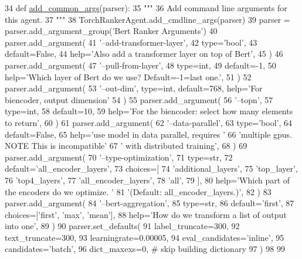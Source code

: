 \begin{DoxyCode}
34 \textcolor{keyword}{def }\hyperlink{namespaceparlai_1_1agents_1_1bert__ranker_1_1helpers_ac2e926c3aba3a62be09e2c37dffcaee2}{add\_common\_args}(parser):
35     \textcolor{stringliteral}{"""}
36 \textcolor{stringliteral}{    Add command line arguments for this agent.}
37 \textcolor{stringliteral}{    """}
38     TorchRankerAgent.add\_cmdline\_args(parser)
39     parser = parser.add\_argument\_group(\textcolor{stringliteral}{'Bert Ranker Arguments'})
40     parser.add\_argument(
41         \textcolor{stringliteral}{'--add-transformer-layer'},
42         type=\textcolor{stringliteral}{'bool'},
43         default=\textcolor{keyword}{False},
44         help=\textcolor{stringliteral}{'Also add a transformer layer on top of Bert'},
45     )
46     parser.add\_argument(
47         \textcolor{stringliteral}{'--pull-from-layer'},
48         type=int,
49         default=-1,
50         help=\textcolor{stringliteral}{'Which layer of Bert do we use? Default=-1=last one.'},
51     )
52     parser.add\_argument(
53         \textcolor{stringliteral}{'--out-dim'}, type=int, default=768, help=\textcolor{stringliteral}{'For biencoder, output dimension'}
54     )
55     parser.add\_argument(
56         \textcolor{stringliteral}{'--topn'},
57         type=int,
58         default=10,
59         help=\textcolor{stringliteral}{'For the biencoder: select how many elements to return'},
60     )
61     parser.add\_argument(
62         \textcolor{stringliteral}{'--data-parallel'},
63         type=\textcolor{stringliteral}{'bool'},
64         default=\textcolor{keyword}{False},
65         help=\textcolor{stringliteral}{'use model in data parallel, requires '}
66         \textcolor{stringliteral}{'multiple gpus. NOTE This is incompatible'}
67         \textcolor{stringliteral}{' with distributed training'},
68     )
69     parser.add\_argument(
70         \textcolor{stringliteral}{'--type-optimization'},
71         type=str,
72         default=\textcolor{stringliteral}{'all\_encoder\_layers'},
73         choices=[
74             \textcolor{stringliteral}{'additional\_layers'},
75             \textcolor{stringliteral}{'top\_layer'},
76             \textcolor{stringliteral}{'top4\_layers'},
77             \textcolor{stringliteral}{'all\_encoder\_layers'},
78             \textcolor{stringliteral}{'all'},
79         ],
80         help=\textcolor{stringliteral}{'Which part of the encoders do we optimize. '}
81         \textcolor{stringliteral}{'(Default: all\_encoder\_layers.)'},
82     )
83     parser.add\_argument(
84         \textcolor{stringliteral}{'--bert-aggregation'},
85         type=str,
86         default=\textcolor{stringliteral}{'first'},
87         choices=[\textcolor{stringliteral}{'first'}, \textcolor{stringliteral}{'max'}, \textcolor{stringliteral}{'mean'}],
88         help=\textcolor{stringliteral}{'How do we transform a list of output into one'},
89     )
90     parser.set\_defaults(
91         label\_truncate=300,
92         text\_truncate=300,
93         learningrate=0.00005,
94         eval\_candidates=\textcolor{stringliteral}{'inline'},
95         candidates=\textcolor{stringliteral}{'batch'},
96         dict\_maxexs=0,  \textcolor{comment}{# skip building dictionary}
97     )
98 
99 
\end{DoxyCode}
